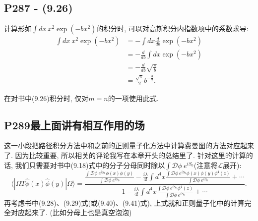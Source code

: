 \subsection{P287 - (9.26)}

计算形如$\int dx\ x^2 \exp(-bx^2)$的积分时, 可以对高斯积分内指数项中的系数求导:
\begin{equation}
  \begin{aligned}
    \int dx\ x^2 \exp(-bx^2) & = -\int dx \frac{d}{db}\exp(-bx^2)      \\
                             & = -\frac{d}{db} \int dx \exp(-bx^2)     \\
                             & = -\frac{d}{db} \sqrt{\frac{\pi}{b}}    \\
                             & = \frac{\sqrt{\pi}}{2}b^{-\frac{3}{2}}.
  \end{aligned}
\end{equation}

在对书中(9.26)积分时, 仅对$m=n$的一项使用此式.

\subsection{P289最上面讲有相互作用的场}
这一小段把路径积分方法中和之前的正则量子化方法中计算费曼图的方法对应起来了.
因为比较重要, 所以相关的评论我写在本章开头的总结里了.
针对这里的计算的话, 我们只需要对书中(9.18)式中的分子分母同时除以$\int \mathcal{D}\phi\ e^{iS_0}$(注意将$\mathcal{L}$展开):
\begin{equation}
  \langle | \Omega T \hat{\phi}(x) \hat{\phi}(y) | \Omega \rangle = \frac{\frac{\int \mathcal{D}\phi\ e^{iS_0} \phi(x)\phi(y)}{\int \mathcal{D}\phi\ e^{iS_0}} - \frac{i\lambda}{4!}\int d^4x \frac{\int \mathcal{D}\phi\ e^{iS_0} \phi(x)\phi(y)\phi^4(z)}{\int \mathcal{D}\phi\ e^{iS_0}}+\cdots}{1 - \frac{i\lambda}{4!}\int d^4x \frac{\int \mathcal{D}\phi\ e^{iS_0} \phi^4(z)}{\int \mathcal{D}\phi\ e^{iS_0}}+\cdots}.
\end{equation}
再考虑书中(9.28)、(9.29)式(或(9.40)、(9.41)式), 上式就和正则量子化中的计算完全对应起来了. (比如分母上也是真空泡泡)

